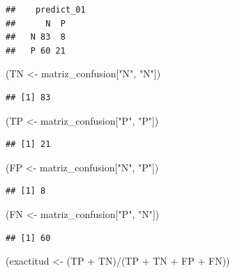 \documentclass[
  12pt,
]{book}
\newenvironment{Shaded}{\begin{snugshade}}{\end{snugshade}}
\newcommand{\NormalTok}[1]{#1}
\newcommand{\OtherTok}[1]{\textcolor[rgb]{0.56,0.35,0.01}{#1}}
\newcommand{\SpecialCharTok}[1]{\textcolor[rgb]{0.00,0.00,0.00}{#1}}
\newcommand{\StringTok}[1]{\textcolor[rgb]{0.31,0.60,0.02}{#1}}
\theoremstyle{definition}
\theoremstyle{definition}
\theoremstyle{definition}
\theoremstyle{definition}
\theoremstyle{remark}
\begin{document}
\begin{verbatim}
##    predict_01
##      N  P
##   N 83  8
##   P 60 21
\end{verbatim}

\begin{Shaded}
\begin{Highlighting}[]
\NormalTok{(TN }\OtherTok{\textless{}{-}}\NormalTok{ matriz\_confusion[}\StringTok{"N"}\NormalTok{, }\StringTok{"N"}\NormalTok{])}
\end{Highlighting}
\end{Shaded}

\begin{verbatim}
## [1] 83
\end{verbatim}

\begin{Shaded}
\begin{Highlighting}[]
\NormalTok{(TP }\OtherTok{\textless{}{-}}\NormalTok{ matriz\_confusion[}\StringTok{"P"}\NormalTok{, }\StringTok{"P"}\NormalTok{])}
\end{Highlighting}
\end{Shaded}

\begin{verbatim}
## [1] 21
\end{verbatim}

\begin{Shaded}
\begin{Highlighting}[]
\NormalTok{(FP }\OtherTok{\textless{}{-}}\NormalTok{ matriz\_confusion[}\StringTok{"N"}\NormalTok{, }\StringTok{"P"}\NormalTok{])}
\end{Highlighting}
\end{Shaded}

\begin{verbatim}
## [1] 8
\end{verbatim}

\begin{Shaded}
\begin{Highlighting}[]
\NormalTok{(FN }\OtherTok{\textless{}{-}}\NormalTok{ matriz\_confusion[}\StringTok{"P"}\NormalTok{, }\StringTok{"N"}\NormalTok{])}
\end{Highlighting}
\end{Shaded}

\begin{verbatim}
## [1] 60
\end{verbatim}

\begin{Shaded}
\begin{Highlighting}[]
\NormalTok{(exactitud }\OtherTok{\textless{}{-}}\NormalTok{ (TP }\SpecialCharTok{+}\NormalTok{ TN)}\SpecialCharTok{/}\NormalTok{(TP }\SpecialCharTok{+}\NormalTok{ TN }\SpecialCharTok{+}\NormalTok{ FP }\SpecialCharTok{+}\NormalTok{ FN))}
\end{Highlighting}
\end{Shaded}
\end{document}

